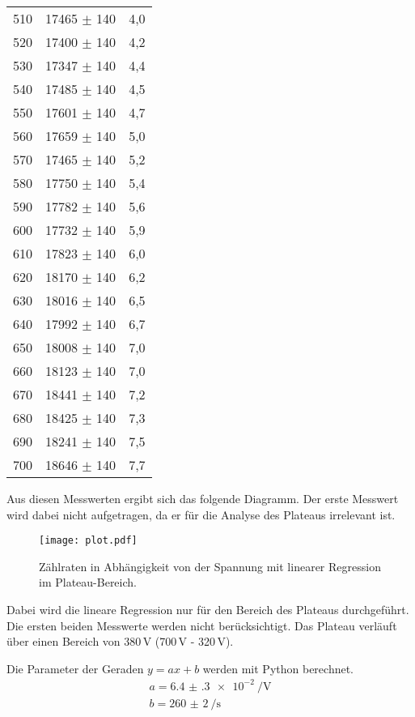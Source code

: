 \begin{table}[H]
\begin{tabular}{c c c}
    510 &	17465 $\pm$ 140 &	4,0 \\
    520 &	17400 $\pm$ 140 &	4,2 \\
    530 &	17347 $\pm$ 140 &	4,4 \\
    540 &	17485 $\pm$ 140 &	4,5 \\
    550 &	17601 $\pm$ 140 &	4,7 \\
    560 &	17659 $\pm$ 140 &	5,0 \\
    570 &	17465 $\pm$ 140 &	5,2 \\
    580 &	17750 $\pm$ 140 &	5,4 \\
    590 &	17782 $\pm$ 140 &	5,6 \\
    600 &	17732 $\pm$ 140 &	5,9 \\
    610 &	17823 $\pm$ 140 &	6,0 \\
    620 &	18170 $\pm$ 140 &	6,2 \\
    630 &	18016 $\pm$ 140 &	6,5 \\
    640 &	17992 $\pm$ 140 &	6,7 \\
    650 &	18008 $\pm$ 140 &	7,0 \\
    660 &	18123 $\pm$ 140 &	7,0 \\
    670 &	18441 $\pm$ 140 &	7,2 \\
    680 &	18425 $\pm$ 140 &	7,3 \\
    690 &	18241 $\pm$ 140 &	7,5 \\
    700 &	18646 $\pm$ 140 &	7,7 \\
    \bottomrule
  \end{tabular}
\end{table}

Aus diesen Messwerten ergibt sich das folgende Diagramm. Der erste Messwert wird
dabei nicht aufgetragen, da er für die Analyse des Plateaus irrelevant ist.

\begin{figure}
  \centering
  \texttt{[image: plot.pdf]}
  \caption{Zählraten in Abhängigkeit von der Spannung mit linearer Regression im Plateau-Bereich.}
  \label{fig:plot}
\end{figure}

Dabei wird die lineare Regression nur für den Bereich des Plateaus durchgeführt. Die ersten beiden
Messwerte werden nicht berücksichtigt. Das Plateau verläuft über einen Bereich von 380\,V (700\,V - 320\,V).

Die Parameter der Geraden $y=ax+b$ werden mit Python berechnet.
\begin{align*}
  a = \SI{6.4(3)e-2}{\per\volt} \\
  b = \SI{260(2)}{\per\second}
\end{align*}

